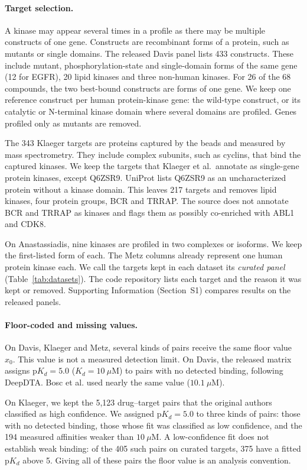 \paragraph{Target selection.} A kinase may appear several times in a profile 
as there may be multiple constructs of one gene. Constructs are recombinant forms
of a protein, such as mutants or single domains. The released Davis panel
lists 433 constructs. These include mutant, phosphorylation-state and
single-domain forms of the same gene (12 for EGFR), 20 lipid kinases and three
non-human kinases. For 26 of the 68 compounds, the two best-bound constructs
are forms of one gene. We keep one reference construct per human
protein-kinase gene: the wild-type construct, or its catalytic or N-terminal
kinase domain where several domains are profiled. Genes profiled only as
mutants are removed.

The 343 Klaeger targets are proteins captured by the beads and measured by
mass spectrometry. They include complex subunits, such as cyclins, that bind
the captured kinases. We keep the targets that Klaeger et al.\ annotate as
single-gene protein kinases, except Q6ZSR9. UniProt lists Q6ZSR9 as an
uncharacterized protein without a kinase domain. This leaves 217 targets and
removes lipid kinases, four protein groups, BCR and TRRAP. The source does not
annotate BCR and TRRAP as kinases and flags them as possibly co-enriched with
ABL1 and CDK8.

On Anastassiadis, nine kinases are profiled in two complexes or isoforms. We
keep the first-listed form of each. The Metz columns already represent one
human protein kinase each. We call the targets kept in each dataset its
\emph{curated panel} (Table~\ref{tab:datasets}). The code repository lists each
target and the reason it was kept or removed. Supporting Information
(Section~S1) compares results on the released panels.

\paragraph{Floor-coded and missing values.} On Davis, Klaeger and Metz, several
kinds of pairs receive the same floor value $x_0$. This value is not a measured
detection limit. On Davis, the
released matrix assigns $\mathrm{p}K_d = 5.0$ ($K_d = 10~\mu$M) to pairs with
no detected binding, following DeepDTA\cite{DeepDTA}. Bosc et
al.\cite{Bosc2017} used nearly the same value ($10.1~\mu$M).

On Klaeger, we kept the 5{,}123 drug--target pairs that the original authors
classified as high confidence. We assigned $\mathrm{p}K_d = 5.0$ to three
kinds of pairs: those with no detected
binding, those whose fit was classified as low confidence, and the 194 measured
affinities weaker than $10~\mu$M. A low-confidence fit does not establish weak
binding: of the 405 such pairs on curated targets, 375 have a fitted
$\mathrm{p}K_d$ above 5. Giving all of these pairs the floor value is an
analysis convention.

